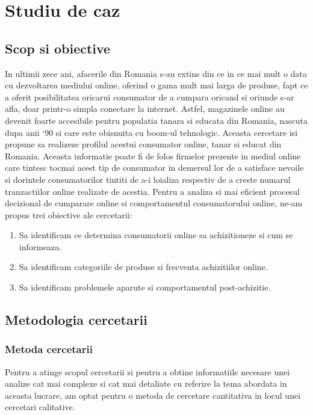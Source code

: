 \documentclass[a4paper, 12pt]{article}
\begin{document}
\section{Studiu de caz }
	\subsection{Scop si obiective}
	
	\qquad In ultimii zece ani, afacerile din Romania s-au extins din ce in ce mai mult o data cu dezvoltarea mediului online, oferind o gama mult mai larga de produse, fapt ce a oferit posibilitatea oricarui consumator de a cumpara oricand si oriunde s-ar afla, doar printr-o simpla conectare la internet. Astfel, magazinele online au devenit foarte accesibile pentru populatia tanara si educata din Romania, nascuta dupa anii `90 si care este obisnuita cu boom-ul tehnologic. Aceasta cercetare isi propune sa realizeze profilul  acestui consumator online, tanar si educat din Romania.  Aceasta informatie poate fi de folos  firmelor prezente in mediul online care tintesc tocmai acest tip de consumator in demersul lor de a satisface nevoile si dorintele consumatorilor tintiti de a-i loializa respectiv de a creste numarul tranzactiilor online realizate de acestia. Pentru a analiza si mai eficient procesul decizional de cumparare online si comportamentul consumatorului online, ne-am propus trei obiective ale cercetarii: 
	\begin{enumerate}[(1)]
		\item Sa identificam ce determina consumatorii online sa achizitioneze si cum se informeaza.
		\item Sa identificam categoriile de produse si frecventa achizitiilor online.
		\item Sa identificam problemele aparute si comportamentul post-achizitie.
	\end{enumerate}
	\subsection{Metodologia cercetarii}
	\subsubsection{Metoda cercetarii}
	\qquad Pentru a atinge scopul cercetarii si pentru a obtine informatiile necesare unei analize cat mai complexe si cat mai detaliate cu referire la tema abordata in aceasta lucrare, am optat pentru o metoda de cercetare cantitativa in locul unei cercetari calitative.
	
\end{document}
